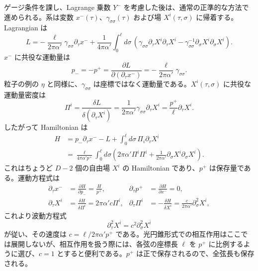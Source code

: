 ゲージ条件を課し、Lagrange 乗数 $Y^-$ を考慮した後は、通常の正準的な方法で進められる。系は変数 $x^-(\tau)$、$\gamma_{\sigma\sigma}(\tau)$ および場 $X^i(\tau,\sigma)$ に帰着する。Lagrangian は
\begin{equation}
L=-\frac{\ell}{2\pi\alpha'}\gamma_{\sigma\sigma}\partial_\tau x^-
+\frac{1}{4\pi\alpha'}\int_0^\ell d\sigma\,
\left(\gamma_{\sigma\sigma}\partial_\tau X^i\partial_\tau X^i
-\gamma_{\sigma\sigma}^{-1}\partial_\sigma X^i\partial_\sigma X^i\right).
\tag{1.3.16}\label{eq:1.3.16}
\end{equation}
$x^-$ に共役な運動量は
\begin{equation}
p_-=-p^+=\frac{\partial L}{\partial(\partial_\tau x^-)}
=-\frac{\ell}{2\pi\alpha'}\gamma_{\sigma\sigma}.
\tag{1.3.17}\label{eq:1.3.17}
\end{equation}
粒子の例の $\eta$ と同様に、$\gamma_{\sigma\sigma}$ は座標ではなく運動量である。$X^i(\tau,\sigma)$ に共役な運動量密度は
\begin{equation}
\Pi^i=\frac{\delta L}{\delta(\partial_\tau X^i)}
=\frac{1}{2\pi\alpha'}\gamma_{\sigma\sigma}\partial_\tau X^i
=\frac{p^+}{\ell}\partial_\tau X^i.
\tag{1.3.18}\label{eq:1.3.18}
\end{equation}
したがって Hamiltonian は
\begin{equation}
\begin{aligned}
H&=p_-\partial_\tau x^- -L+\int_0^\ell d\sigma\,\Pi_i\partial_\tau X^i\\
 &=\frac{\ell}{4\pi\alpha'p^+}\int_0^\ell d\sigma
\left(2\pi\alpha'\Pi^i\Pi^i
+\frac{1}{2\pi\alpha'}\partial_\sigma X^i\partial_\sigma X^i\right).
\end{aligned}
\tag{1.3.19}\label{eq:1.3.19}
\end{equation}
これはちょうど $D-2$ 個の自由場 $X^i$ の Hamiltonian であり、$p^+$ は保存量である。運動方程式は
\begin{align}
\partial_\tau x^-&=\frac{\partial H}{\partial p_-}=\frac{H}{p^+},
&\partial_\tau p^+&=\frac{\partial H}{\partial x^-}=0,
\tag{1.3.20a}\label{eq:1.3.20a}\\
\partial_\tau X^i&=\frac{\delta H}{\delta\Pi^i}=2\pi\alpha'c\Pi^i,
&\partial_\tau\Pi^i&=-\frac{\delta H}{\delta X^i}
=\frac{c}{2\pi\alpha'}\partial_\sigma^2X^i,
\tag{1.3.20b}\label{eq:1.3.20b}
\end{align}
これより波動方程式
\begin{equation}
\partial_\tau^2X^i=c^2\partial_\sigma^2X^i
\tag{1.3.21}\label{eq:1.3.21}
\end{equation}
が従い、その速度は $c=\ell/2\pi\alpha'p^+$ である。光円錐形式での相互作用はここでは展開しないが、相互作用を扱う際には、各弦の座標長 $\ell$ を $p^+$ に比例するように選び、$c=1$ とすると便利である。$p^+$ は正で保存されるので、全弦長も保存される。

